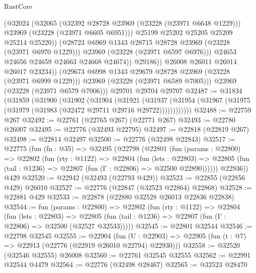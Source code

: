 \begin{lexlean}{RustCore}
\begin{coremodule}
                        (@32024
                          (@32065
                            (@32392 @28728 @23969 (@23228 (@23971 @6648 @1229)))
                            @23969
                            (@23228 (@23971 @6605 @6951)))
                          @25199
                          @25202
                          @25205
                          @25209
                          @25214
                          @25220))
                      (@28723 @6969 @1343 @28715 @28728 @23969 (@23228 (@23971 @6970 @1229)))
                      @23969
                      (@23228 (@23971 @6597 @6976)))
                    @24653
                    @24656
                    @24659
                    @24663
                    @24668
                    @24674))
                @29186))
            @26008
            @26011
            @26014
            @26017
            @23234))
        (@29673 @6998 @1343 @29679 @28728 @23969 (@23228 (@23971 @6999 @1229)))
        @23969
        (@23228 (@23971 @6589 @7005)))
      @23969
      (@23228 (@23971 @6579 @7006)))
    @29701
    @29704
    @29707
@32487 := @31834
    (@31859
      (@31900
        (@31902
          (@31904
            (@31921
              (@31937
                (@31954 (@31967 (@31975 (@31979 (@31983 (@32472 @29711 @29716 @29722))))))))))))
@32488 := @22759 @267
@32492 := @22761 (@22765 @267) (@22771 @267)
@32493 := @22780 @26007
@32495 := @22776 (@32493 @22795)
@32497 := @22818 (@22819 @267)
@32498 := @22814 @32497
@32500 := @22776 (@32498 @22843)
@32517 := @22775
    (fun (fn : @35) =>
    @32495
      (@22798
        (@22801
          (fun (params : @22800) =>
          @22802
            (fun (rty : @1122) =>
            @22804
              (fun (lets : @22803) =>
              @22805 (fun (tail : @1236) => @22807 (fun (Γ : @22806) => @32500 @22890))))))
        @22936))
    @429
@32520 := @22942 (@32493 (@22793 @429))
@32523 := @22855 (@22856 @429) @26010
@32527 := @22776 (@22847 (@32523 @22864) @22868)
@32528 := @22881 @429
@32533 := @22878 (@22880 @32528 @26013 @22836 @22838)
@32544 := fun (params : @22800) =>
  @22802
    (fun (rty : @1122) =>
    @22804
      (fun (lets : @22803) =>
      @22805 (fun (tail : @1236) => @22807 (fun (Γ : @22806) => @32500 (@32527 @32533)))))
@32545 := @22801 @32544
@32546 := @22798 @32545
@32555 := @22904
    (fun (U : @22903) => @22905 (fun (t : @7) => @22913 (@22776 (@22919 @26010 @22794) @22930)))
@32558 := @32520 (@32546 @32555) @26008
@32560 := @22761 @32545 @32555
@32562 := @22991 @32544 @4479
@32564 := @22776 (@32498 @28467)
@32565 := @32523 @28470

\end{coremodule}
\end{lexlean}
